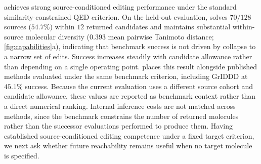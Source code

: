 \method{} achieves strong source-conditioned editing performance under the standard similarity-constrained QED criterion. On the held-out evaluation, \method{} solves $70/128$ sources ($54.7\%$) within $12$ returned candidates and maintains substantial within-source molecular diversity ($0.393$ mean pairwise Tanimoto distance; \cref{fig:capabilities}a), indicating that benchmark success is not driven by collapse to a narrow set of edits. Success increases steadily with candidate allowance rather than depending on a single operating point.  places this result alongside published methods evaluated under the same benchmark criterion, including GrIDDD at $45.1\%$ success. Because the current \method{} evaluation uses a different source cohort and candidate allowance, these values are reported as benchmark context rather than a direct numerical ranking. Internal inference costs are not matched across methods, since the benchmark constrains the number of returned molecules rather than the successor evaluations performed to produce them. Having established source-conditioned editing competence under a fixed target criterion, we next ask whether future reachability remains useful when no target molecule is specified.


